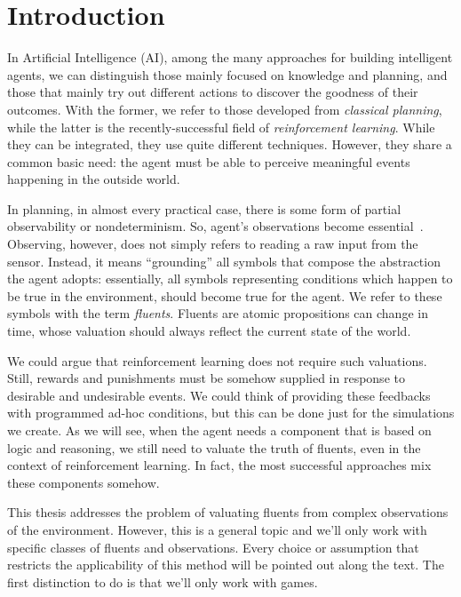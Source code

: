 \chapter{Introduction}

In Artificial Intelligence (AI), among the many approaches for building
intelligent agents, we can distinguish those mainly focused on knowledge and
planning, and those that mainly try out different actions to discover the
goodness of their outcomes. With the former, we refer to those developed from
\emph{classical planning}, while the latter is the recently-successful field
of \emph{reinforcement learning}. While they can be integrated, they use quite
different techniques. However, they share a common basic need: the agent must
be able to perceive meaningful events happening in the outside world.

In planning, in almost every practical case, there is some form of partial
observability or nondeterminism. So, agent's observations become
essential~\cite{bib:aima}. Observing, however, does not simply refers to
reading a raw input from the sensor. Instead, it means ``grounding'' all
symbols that compose the abstraction the agent adopts: essentially, all
symbols representing conditions which happen to be true in the environment,
should become true for the agent. We refer to these symbols with the term
\emph{fluents}.  Fluents are atomic propositions can change in time, whose
valuation should always reflect the current state of the world.

We could argue that reinforcement learning does not require such valuations.
Still, rewards and punishments must be somehow supplied in response to
desirable and undesirable events. We could think of providing these feedbacks
with programmed ad-hoc conditions, but this can be done just for the
simulations we create. As we will see, when the agent needs a component that
is based on logic and reasoning, we still need to valuate the truth of fluents,
even in the context of reinforcement learning.  In fact, the most successful
approaches mix these components somehow.

This thesis addresses the problem of valuating fluents from complex
observations of the environment. However, this is a general topic and we'll
only work with specific classes of fluents and observations. Every choice
or assumption that restricts the applicability of this method will be pointed
out along the text. The first distinction to do is that we'll only work with
games.


